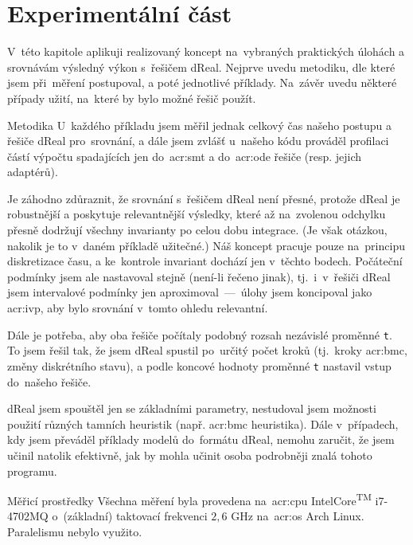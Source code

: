 \documentclass[thesis=M,czech]{FITthesis}[2012/06/26]
\newcommand{\acrlabel}[1]{acr:#1}
\newcommand{\acr}[1]{\acrshort{\acrlabel{#1}}}
\newcommand{\id}[1]{\texttt{#1}}
\newcommand{\reg}{\textsuperscript{\textregistered}}
\begin{document}


\chapter{Experimentální část}\label{ch:exp}
V~této kapitole aplikuji realizovaný koncept
na~vybraných praktických úlohách
a srovnávám výsledný výkon s~řešičem dReal.
Nejprve uvedu metodiku,
dle které jsem při~měření postupoval,
a poté jednotlivé příklady.
Na~závěr uvedu některé případy užití,
na~které by bylo možné řešič použít.


\begin{section}{Metodika}\label{s:exp:method}
U~každého příkladu jsem měřil jednak celkový čas
našeho postupu a řešiče dReal pro~srovnání,
a dále jsem zvlášť u~našeho kódu prováděl
profilaci částí výpočtu spadajících
jen do~\acr{smt} a do~\acr{ode} řešiče
(resp. jejich adaptérů).

Je záhodno zdůraznit, že srovnání
s~řešičem dReal není přesné,
protože dReal je robustnější a poskytuje
relevantnější výsledky, které až na~zvolenou odchylku
přesně dodržují všechny invarianty po celou dobu integrace.
(Je však otázkou, nakolik je to v~daném příkladě užitečné.)
Náš koncept pracuje pouze na~principu diskretizace času,
a ke~kontrole invariant dochází jen v~těchto bodech.
Počáteční podmínky jsem ale nastavoval stejně (není-li řečeno jinak),
tj.~i~v~řešiči dReal jsem intervalové podmínky
jen aproximoval~---~úlohy jsem koncipoval jako \acr{ivp},
aby bylo srovnání v~tomto ohledu relevantní.

Dále je potřeba, aby oba řešiče počítaly
podobný rozsah nezávislé proměnné \id{t}.
To jsem řešil tak, že jsem dReal spustil
po~určitý počet kroků (tj.~kroky \acr{bmc}, změny diskrétního stavu),
a podle koncové hodnoty proměnné \id{t}
nastavil vstup do~našeho řešiče.

dReal jsem spouštěl jen se základními parametry,
nestudoval jsem možnosti použití různých tamních heuristik
(např. \acr{bmc} heuristika).
Dále v~případech, kdy jsem převáděl příklady modelů
do~formátu dReal, nemohu zaručit,
že jsem učinil natolik efektivně,
jak by mohla učinit osoba
podrobněji znalá tohoto programu.


\begin{subsection}{Měřicí prostředky}\label{ss:exp:method:resources}
Všechna měření byla provedena
na~\acr{cpu}
Intel\reg Core\textsuperscript{TM}
i7-4702MQ o~(základní) taktovací frekvenci $2{,}6$ GHz
na~\acr{os} Arch Linux.
Paralelismu nebylo využito.


\end{subsection}
\end{section}
\end{document}

